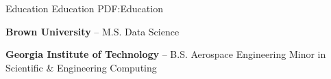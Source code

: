 \documentclass[letterpaper,MMMyyyy,nonstopmode]{simpleresumecv}
\begin{document}
\begin{Body}
\Section
{Education}
{Education}
{PDF:Education}

\Entry \textbf{Brown University}
\hfill
{} -- 
\BulletItem M.S. Data Science

\Entry \textbf{Georgia Institute of Technology}
\hfill
{} -- 
\BulletItem B.S. Aerospace Engineering
\BulletItem
Minor in Scientific \& Engineering Computing

%
%


\end{Body}
\end{document}
